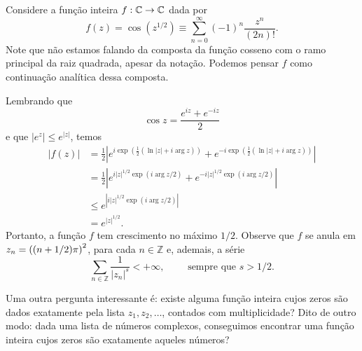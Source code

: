     \begin{exemplo}
        Considere a função inteira $f:\mathbb{C}\to\mathbb{C}$ dada por
        \begin{equation*}
            f(z) = \cos(z^{1/2}) \equiv \sum_{n=0}^{\infty} (-1)^n \frac{z^n}{(2n)!}.
        \end{equation*}
        Note que não estamos falando da composta da função cosseno com o ramo
        principal da raiz quadrada, apesar da notação. Podemos pensar $f$ como
        continuação analítica dessa composta.
        
        Lembrando que
        \begin{equation*}
            \cos z = \frac{e^{iz} + e^{-iz}}{2}
        \end{equation*}
        e que $|e^z| \leq e^{|z|}$, temos
        \begin{align*}
            |f(z)| &= \frac{1}{2}\left| 
            e^{i\exp\left(\frac{1}{2}(\ln|z| + i\arg z)\right)} 
            + e^{-i\exp\left(\frac{1}{2}(\ln|z| + i\arg z)\right)} \right| \\
            &= \frac{1}{2}\left| e^{i|z|^{1/2}\exp(i\arg z/2)} 
            + e^{-i|z|^{1/2}\exp(i\arg z/2)} \right| \\
            &\leq e^{ \left| i|z|^{1/2}\exp(i\arg z/2) \right| } \\
            &= e^{|z|^{1/2}}.
        \end{align*}
        Portanto, a função $f$ tem crescimento no máximo $1/2$. 
        Observe que $f$ se anula 
        em $z_n = \displaystyle \left( (n+1/2)\pi \right)^2$, para cada $n\in\mathbb{Z}$ e, ademais, a série
        \begin{equation*}
            \sum_{n\in\mathbb{Z}} \frac{1}{|z_n|^s} < +\infty,
            \qquad \text{ sempre que } s > 1/2.
        \end{equation*}
    \end{exemplo}



    \bigskip 
    



    Uma outra pergunta interessante é: existe alguma função inteira cujos zeros são
    dados exatamente pela lista $z_1, z_2, \dots$, contados com multiplicidade? Dito
    de outro modo: dada uma lista de números complexos, conseguimos encontrar uma 
    função inteira cujos zeros são exatamente aqueles números?
    

